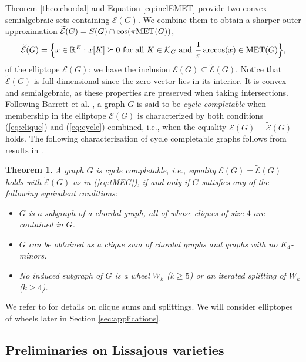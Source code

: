 \documentclass[a4paper, 11pt, twoside]{article}
\newcommand{\R}{\mathbb{R}}
\newcommand{\ME}{{\mathcal E}}
\newcommand{\MET}{\text{\rm MET}}
\newcommand{\MK}{{\mathcal K}}
\newcommand{\tME}{\widetilde \ME}
\theoremstyle{plain}
\newtheorem{theorem}{Theorem}[section]
\begin{document}
Theorem \ref{theo:chordal} and Equation \eqref{eq:inclEMET} provide  two convex semialgebraic sets  containing $\ME(G)$. We combine them to obtain a sharper outer approximation  $\tME(G)= S(G)\cap \cos (\pi\MET(G))$,  
\begin{align}\label{eq:tMEG}
\begin{split}
\tME(G)  
=
\Big\{x\in \R^E: x[K]\succeq 0 \text{ for all } K\in\MK_G  \text{ and } {1\over \pi}\arccos(x)\in\MET(G)\Big\},
\end{split}
\end{align}
  of the elliptope $\ME(G)$: we have the inclusion $\ME(G)\subseteq \tME(G)$. Notice that $\tME(G)$  is full-dimensional since the zero vector lies in its interior. It is convex and semialgebraic, as these properties are preserved when taking intersections. 
Following Barrett et al.  \cite{BJL-cycle-completability}, a graph $G$ is said to be {\em cycle completable}  when membership in the elliptope $\ME(G)$ is characterized by both conditions (\ref{eq:clique}) and (\ref{eq:cycle}) combined, i.e., when the equality $\ME(G)=\tME(G)$ holds.
The following characterization of cycle completable graphs follows from results in \cite{BJL-cycle-completability,Johnson-McKee}.

\begin{theorem}\cite{BJL-cycle-completability,Johnson-McKee}\label{theo:cycle-completable} 
A graph $G$ is cycle completable, i.e., equality $\ME(G)=\tME(G)$ holds with $\tME(G)$ as in (\ref{eq:tMEG}), 
if and only if $G$ satisfies any of the following equivalent conditions:
\begin{itemize}
\item[(i)] $G$ is a subgraph of a chordal graph, all of whose cliques of size $4$ are contained in $G$.
\item[(ii)] $G$ can be obtained as a clique sum of chordal graphs and graphs with no $K_4$-minors.
\item[(iii)] No induced subgraph of $G$ is a wheel $W_k$ ($k\ge 5$) or an iterated splitting of $W_k$ ($k\ge 4$).
\end{itemize}
\end{theorem}
We refer to \cite{BJL-cycle-completability,Johnson-McKee} for details on clique sums and splittings.
We will consider elliptopes of wheels later in Section \ref{sec:applications}.

\subsection{Preliminaries on Lissajous varieties}  \label{sec:lissajous} 
\end{document}
